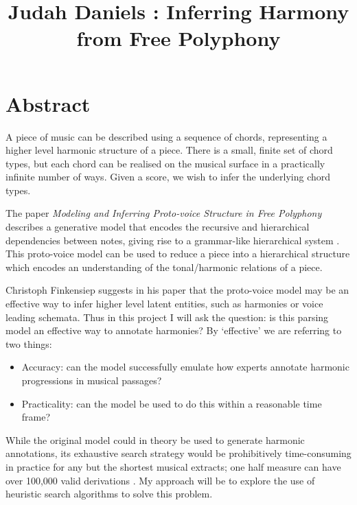 \documentclass{article}
\title{Judah Daniels : Inferring Harmony from Free Polyphony}
\author{}
\date{\parbox{\linewidth}{\centering%
  \today\endgraf\bigskip
  DOS: Prof. Larry Paulson\endgraf\medskip
  Crsid: jasd6 \endgraf
  College: Clare College}}
\begin{document}
\maketitle


\section{Abstract}
A piece of music can be described using a sequence of chords, representing a higher level harmonic structure of a piece. There is a small, finite set of chord types, but each chord can be realised on the musical surface in a practically infinite number of ways. Given a score, we wish to infer the underlying chord types. 
\par
The paper \textit{Modeling and Inferring Proto-voice Structure in Free Polyphony} describes a generative model that encodes the recursive and hierarchical dependencies between notes, giving rise to a grammar-like hierarchical system \cite{finkensiep_modeling_2021}. This proto-voice model can be used to reduce a piece into a hierarchical structure which encodes an understanding of the tonal/harmonic relations of a piece. 
\par
Christoph Finkensiep suggests in his paper that the proto-voice model may be an effective way to infer higher level latent entities, such as harmonies or voice leading schemata. Thus in this project I will ask the question: is this parsing model an effective way to annotate harmonies? By `effective' we are referring to two things: \begin{itemize}
  \item Accuracy: can the model successfully emulate how experts annotate harmonic progressions in musical passages? 
  \item Practicality: can the model be used to do this within a reasonable time frame?
\end{itemize}
While the original model could in theory be used to generate harmonic annotations, its exhaustive search strategy would be prohibitively time-consuming in practice for any but the shortest musical extracts; one half measure can have over 100,000 valid derivations \cite{finkensiep_modeling_2021}. My approach will be to explore the use of heuristic search algorithms to solve this problem.
\end{document}
